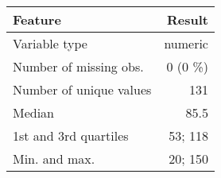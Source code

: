\documentclass[]{article}
\begin{document}
\begin{longtable}[]{@{}lr@{}}
\toprule
\begin{minipage}[b]{0.34\columnwidth}\raggedright\strut
Feature\strut
\end{minipage} & \begin{minipage}[b]{0.12\columnwidth}\raggedleft\strut
Result\strut
\end{minipage}\tabularnewline
\midrule
\endhead
\begin{minipage}[t]{0.34\columnwidth}\raggedright\strut
Variable type\strut
\end{minipage} & \begin{minipage}[t]{0.12\columnwidth}\raggedleft\strut
numeric\strut
\end{minipage}\tabularnewline
\begin{minipage}[t]{0.34\columnwidth}\raggedright\strut
Number of missing obs.\strut
\end{minipage} & \begin{minipage}[t]{0.12\columnwidth}\raggedleft\strut
0 (0 \%)\strut
\end{minipage}\tabularnewline
\begin{minipage}[t]{0.34\columnwidth}\raggedright\strut
Number of unique values\strut
\end{minipage} & \begin{minipage}[t]{0.12\columnwidth}\raggedleft\strut
131\strut
\end{minipage}\tabularnewline
\begin{minipage}[t]{0.34\columnwidth}\raggedright\strut
Median\strut
\end{minipage} & \begin{minipage}[t]{0.12\columnwidth}\raggedleft\strut
85.5\strut
\end{minipage}\tabularnewline
\begin{minipage}[t]{0.34\columnwidth}\raggedright\strut
1st and 3rd quartiles\strut
\end{minipage} & \begin{minipage}[t]{0.12\columnwidth}\raggedleft\strut
53; 118\strut
\end{minipage}\tabularnewline
\begin{minipage}[t]{0.34\columnwidth}\raggedright\strut
Min. and max.\strut
\end{minipage} & \begin{minipage}[t]{0.12\columnwidth}\raggedleft\strut
20; 150\strut
\end{minipage}\tabularnewline
\bottomrule
\end{longtable}
\end{document}
